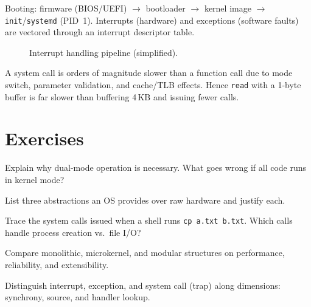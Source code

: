 Booting: firmware (BIOS/UEFI) $\to$ bootloader $\to$ kernel image $\to$
\texttt{init}/\texttt{systemd} (PID~1). Interrupts (hardware) and exceptions
(software faults) are vectored through an interrupt descriptor table.

\begin{figure}[h!]
\centering
{}
\caption{Interrupt handling pipeline (simplified).}
\label{fig:interrupt}
\end{figure}

\begin{remark}
A system call is orders of magnitude slower than a function call due to mode
switch, parameter validation, and cache/TLB effects. Hence \texttt{read} with
a 1-byte buffer is far slower than buffering 4\,KB and issuing fewer calls.
\end{remark}

\section{Exercises}
\label{sec:ch01-ex}
\begin{exercise}
Explain why dual-mode operation is necessary. What goes wrong if all code runs
in kernel mode?
\end{exercise}
\begin{exercise}
List three abstractions an OS provides over raw hardware and justify each.
\end{exercise}
\begin{exercise}
Trace the system calls issued when a shell runs \texttt{cp a.txt b.txt}.
Which calls handle process creation vs.\ file I/O?
\end{exercise}
\begin{exercise}
Compare monolithic, microkernel, and modular structures on performance,
reliability, and extensibility.
\end{exercise}
\begin{exercise}
Distinguish interrupt, exception, and system call (trap) along dimensions:
synchrony, source, and handler lookup.
\end{exercise}
